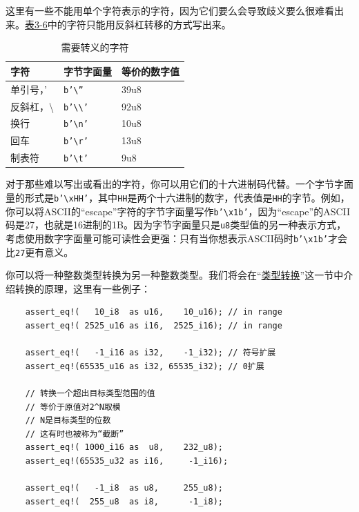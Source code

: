 这里有一些不能用单个字符表示的字符，因为它们要么会导致歧义要么很难看出来。\hyperref[t3-6]{表3-6}中的字符只能用反斜杠转移的方式写出来。
\begin{table}[htbp]
    \centering
    \caption{需要转义的字符}
    \label{t3-6}
    \begin{tabular}{lll}
        \hline
        \textbf{字符}   &   \textbf{字节字面量} & \textbf{等价的数字值} \\
        \hline
        单引号，'   &   \texttt{b'\textbackslash''}      & 39u8 \\
        \rowcolor{tablecolor}
        反斜杠，\textbackslash &    \texttt{b'\textbackslash\textbackslash'} & 92u8 \\
        换行        &    \texttt{b'\textbackslash n'}    & 10u8 \\
        \rowcolor{tablecolor}
        回车        &   \texttt{b'\textbackslash r'}     & 13u8 \\
        制表符      &   \texttt{b'\textbackslash t'}     & 9u8 \\
    \end{tabular}
\end{table}

对于那些难以写出或看出的字符，你可以用它们的十六进制码代替。一个字节字面量的形式是\texttt{b'\textbackslash xHH'}，其中\texttt{HH}是两个十六进制的数字，代表值是\texttt{HH}的字节。例如，你可以将ASCII的“escape”字符的字节字面量写作\texttt{b'\textbackslash x1b'}，因为“escape”的ASCII码是27，也就是16进制的1B。因为字节字面量只是\texttt{u8}类型值的另一种表示方式，考虑使用数字字面量可能可读性会更强：只有当你想表示ASCII码时\texttt{b'\textbackslash x1b'}才会比\texttt{27}更有意义。

你可以将一种整数类型转换为另一种整数类型。我们将会在“\hyperref[cast]{类型转换}”这一节中介绍转换的原理，这里有一些例子：
\begin{verbatim}
    assert_eq!(   10_i8  as u16,    10_u16); // in range
    assert_eq!( 2525_u16 as i16,  2525_i16); // in range

    assert_eq!(   -1_i16 as i32,    -1_i32); // 符号扩展
    assert_eq!(65535_u16 as i32, 65535_i32); // 0扩展

    // 转换一个超出目标类型范围的值
    // 等价于原值对2^N取模
    // N是目标类型的位数
    // 这有时也被称为“截断”
    assert_eq!( 1000_i16 as  u8,    232_u8);
    assert_eq!(65535_u32 as i16,     -1_i16);

    assert_eq!(   -1_i8  as u8,     255_u8);
    assert_eq!(  255_u8  as i8,      -1_i8);
\end{verbatim}

